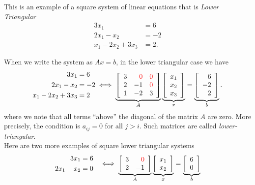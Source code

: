 This is an example of a square system of linear equations that is \textit{Lower Triangular}
\begin{equation}
    \begin{aligned}
     3 x_1 &=6 \\
     2 x_1 - x_2 &= -2\\
    x_1 - 2 x_2 + 3 x_3  &= 2.
    \end{aligned}
\end{equation}

When we write the system as $Ax=b$, in the lower triangular case we have
\begin{equation} 
\label{eq:LT01}
\begin{aligned}
     3 x_1 &=6 \\
     2 x_1 - x_2 &= -2\\
    x_1 - 2 x_2 + 3 x_3  &= 2
    \end{aligned} \iff \underbrace{\left[\begin{array}{rrr} 3 & \color{red} 0 & \color{red} 0\\
2 & -1 & \color{red} 0 \\ 1 & -2 & 3  \end{array}\right]}_{A}  \underbrace{\left[\begin{array}{c} x_1 \\x_2 \\x_3\end{array} \right]}_{x}
= \underbrace{\left[\begin{array}{r} 6 \\-2 \\2\end{array} \right]}_{b}.
\end{equation}
where we note that all terms ``above'' the diagonal of the matrix $A$ are zero. More precisely, the condition is 
 $a_{ij}=0$ for all $j > i$. Such matrices are called \textit{lower-triangular}. \\


Here are two more examples of square lower triangular systems
\begin{equation}
\label{eq:LT02}
\begin{array}{cc}
  \begin{aligned}
     3 x_1 &=6 \\
     2 x_1 - x_2 & =0
    \end{aligned} &  \iff \underbrace{\left[\begin{array}{rr} 3 & \color{red} 0\\
2 & -1  \end{array}\right]}_{A}  \underbrace{\left[\begin{array}{c} x_1 \\x_2 \end{array} \right]}_{x}
= \underbrace{\left[\begin{array}{r} 6 \\0 \end{array} \right]}_{b}
    \end{array}
\end{equation}

